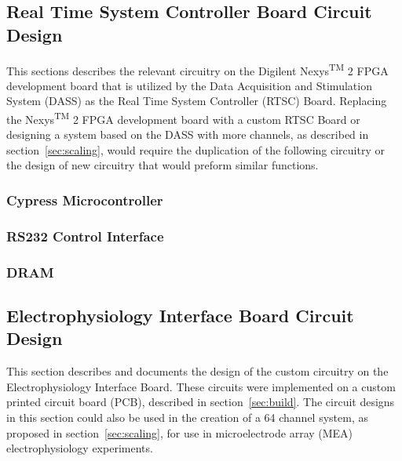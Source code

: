 \documentclass{article}
\begin{document}


\subsection{Real Time System Controller Board Circuit Design}

This sections describes the relevant circuitry on the Digilent\textsuperscript{\textregistered} Nexys\textsuperscript{TM} 2 FPGA development board that is utilized by the Data Acquisition and Stimulation System (DASS) as the Real Time System Controller (RTSC) Board.  Replacing the Nexys\textsuperscript{TM} 2 FPGA development board with a custom RTSC Board or designing a system based on the DASS with more channels, as described in section~\ref{sec:scaling}, would require the duplication of the following circuitry or the design of new circuitry that would preform similar functions.

\subsubsection{Cypress Microcontroller}



\subsubsection{RS232 Control Interface}



\subsubsection{DRAM}



\subsection{Electrophysiology Interface Board Circuit Design}

This section describes and documents the design of the custom circuitry on the Electrophysiology Interface Board.  These circuits were implemented on a custom printed circuit board (PCB), described in section~\ref{sec:build}.  The circuit designs in this section could also be used in the creation of a 64 channel system, as proposed in section~\ref{sec:scaling}, for use in microelectrode array (MEA) electrophysiology experiments.
\end{document}
